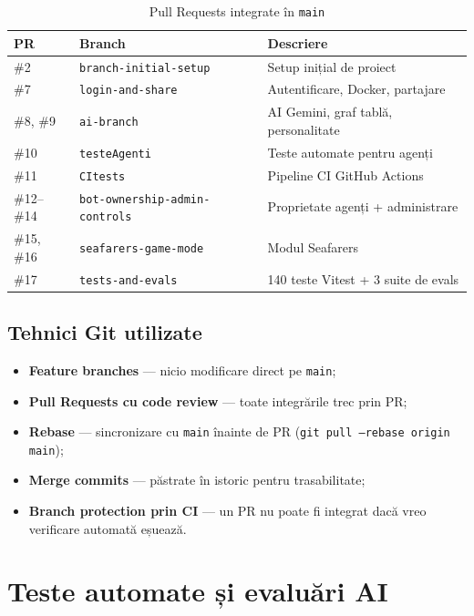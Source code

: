 \documentclass[11pt,a4paper]{article}
\begin{document}
\begin{table}[H]
\centering
\begin{tabularx}{\textwidth}{@{}l l X@{}}
\toprule
\textbf{PR} & \textbf{Branch} & \textbf{Descriere} \\
\midrule
\#2  & \texttt{branch-initial-setup} & Setup inițial de proiect \\
\#7  & \texttt{login-and-share} & Autentificare, Docker, partajare \\
\#8, \#9 & \texttt{ai-branch} & AI Gemini, graf tablă, personalitate \\
\#10 & \texttt{testeAgenti} & Teste automate pentru agenți \\
\#11 & \texttt{CItests} & Pipeline CI GitHub Actions \\
\#12--\#14 & \texttt{bot-ownership-admin-controls} & Proprietate agenți + administrare \\
\#15, \#16 & \texttt{seafarers-game-mode} & Modul Seafarers \\
\#17 & \texttt{tests-and-evals} & 140 teste Vitest + 3 suite de evals \\
\bottomrule
\end{tabularx}
\caption{Pull Requests integrate în \texttt{main}}
\end{table}

\subsection{Tehnici Git utilizate}

\begin{itemize}
  \item \textbf{Feature branches} --- nicio modificare direct pe \texttt{main};
  \item \textbf{Pull Requests cu code review} --- toate integrările trec prin PR;
  \item \textbf{Rebase} --- sincronizare cu \texttt{main} înainte de PR
        (\texttt{git pull --rebase origin main});
  \item \textbf{Merge commits} --- păstrate în istoric pentru trasabilitate;
  \item \textbf{Branch protection prin CI} --- un PR nu poate fi integrat
        dacă vreo verificare automată eșuează.
\end{itemize}

\section{Teste automate și evaluări AI}
\label{sec:teste}
\end{document}
